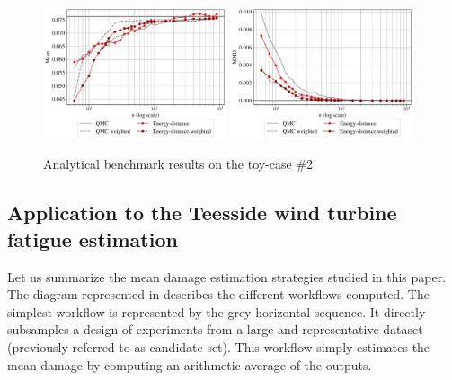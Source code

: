 \begin{figure}[!h]
\begin{center}
    \includegraphics[width=0.48\textwidth]{part2/figures/DCE/analytical_bench/GSobol_10D_(normal_input)_convergence_ED.pdf}
    \includegraphics[width=0.48\textwidth]{part2/figures/DCE/analytical_bench/GSobol_10D_(normal_input)_convergence_MMD_ED.pdf}\\
\end{center}
\caption{Analytical benchmark results on the toy-case \#2} \label{fig:toy-case2}
\end{figure}

\subsection{Application to the Teesside wind turbine fatigue estimation}
Let us summarize the mean damage estimation strategies studied in this paper. 
The diagram represented in  describes the different workflows computed. 
The simplest workflow is represented by the grey horizontal sequence. 
It directly subsamples a design of experiments from a large and representative dataset (previously referred to as candidate set). 
This workflow simply estimates the mean damage by computing an arithmetic average of the outputs. 

